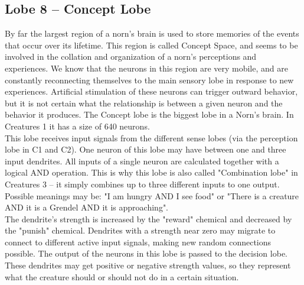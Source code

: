 \documentclass[11pt,twoside,a4paper]{article}
\begin{document}


\subsection{Lobe 8 -- Concept Lobe}


By far the largest region of a norn's brain is used to store memories of the events that occur over its lifetime. This region is called Concept Space, and seems to be involved in the collation and organization of a norn's perceptions and experiences. We know that the neurons in this region are very mobile, and are constantly reconnecting themselves to the main sensory lobe in response to new experiences. Artificial stimulation of these neurons can trigger outward behavior, but it is not certain what the relationship is between a given neuron and the behavior it produces. The Concept lobe is the biggest lobe in a Norn's brain. In Creatures 1 it has a size of 640 neurons.~\\


This lobe receives input signals from the different sense lobes (via the perception lobe in C1 and C2). One neuron of this lobe may have between one and three input dendrites. All inputs of a single neuron are calculated together with a logical AND operation. This is why this lobe is also called "Combination lobe" in Creatures 3 -- it simply combines up to three different inputs to one output. Possible meanings may be: "I am hungry AND I see food" or "There is a creature AND it is a Grendel AND it is approaching".~\\


The dendrite's strength is increased by the "reward" chemical and decreased by the "punish" chemical. Dendrites with a strength near zero may migrate to connect to different active input signals, making new random connections possible. The output of the neurons in this lobe is passed to the decision lobe. These dendrites may get positive or negative strength values, so they represent what the creature should or should not do in a certain situation.~\\
\end{document}
